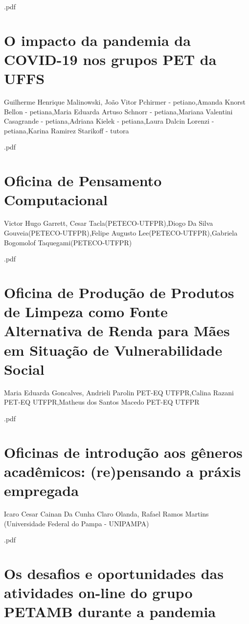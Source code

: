 

.pdf\section{O impacto da pandemia da COVID-19 nos grupos PET da UFFS}

Guilherme Henrique Malinowski, João Vitor Pchirmer - petiano,Amanda Knorst Bellon - petiana,Maria Eduarda Artuso Schnorr - petiana,Mariana Valentini Casagrande - petiana,Adriana Kielek - petiana,Laura Dalcin Lorenzi - petiana,Karina Ramirez Starikoff - tutora



.pdf\section{Oficina de Pensamento Computacional}

Victor Hugo Garrett, Cesar Tacla(PETECO-UTFPR),Diogo Da Silva Gouveia(PETECO-UTFPR),Felipe Augusto Lee(PETECO-UTFPR),Gabriela Bogomolof Taquegami(PETECO-UTFPR)



.pdf\section{Oficina de Produção de Produtos de Limpeza como Fonte Alternativa de Renda para Mães em Situação de Vulnerabilidade Social}

Maria Eduarda Goncalves, Andrieli Parolin PET-EQ UTFPR,Calina Razani PET-EQ UTFPR,Matheus dos Santos Macedo PET-EQ UTFPR



.pdf\section{Oficinas de introdução aos gêneros acadêmicos: (re)pensando a práxis empregada }

Icaro Cesar Cainan Da Cunha Claro Olanda, Rafael Ramos Martins (Universidade Federal do Pampa - UNIPAMPA)



.pdf\section{Os desafios e oportunidades das atividades on-line do grupo PETAMB durante a pandemia}


